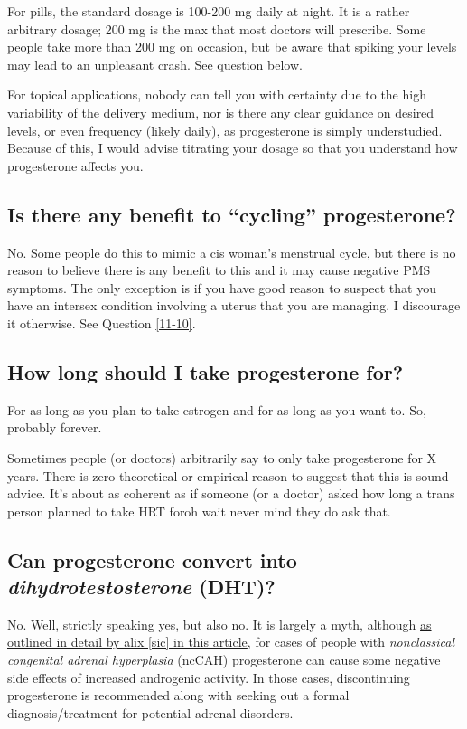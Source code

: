 \documentclass{article}
\begin{document}
For pills, the standard dosage is 100-200 mg daily at night. It is a rather arbitrary dosage; 200 mg is the max that most doctors will prescribe. Some people take more than 200 mg on occasion, but be aware that spiking your levels may lead to an unpleasant crash. See question below.

For topical applications, nobody can tell you with certainty due to the high variability of the delivery medium, nor is there any clear guidance on desired levels, or even frequency (likely daily), as progesterone is simply understudied. Because of this, I would advise titrating your dosage so that you understand how progesterone affects you.

\subsection{Is there any benefit to “cycling” progesterone?}\label{8-11}

No. Some people do this to mimic a cis woman’s menstrual cycle, but there is no reason to believe there is any benefit to this and it may cause negative PMS symptoms. The only exception is if you have good reason to suspect that you have an intersex condition involving a uterus that you are managing. I discourage it otherwise. See Question \ref{11-10}.

\subsection{How long should I take progesterone for?}

For as long as you plan to take estrogen and for as long as you want to. So, probably forever.

Sometimes people (or doctors) arbitrarily say to only take progesterone for X years. There is zero theoretical or empirical reason to suggest that this is sound advice. It's about as coherent as if someone (or a doctor) asked how long a trans person planned to take HRT for\textemdash{}oh wait never mind they do ask that.

\subsection{Can progesterone convert into \textit{dihydrotestosterone} (DHT)?}

No. Well, strictly speaking yes, but also no. It is largely a myth, although \href{https://whsah.co/posts/rethinking-progesterone-and-androgens/}{as outlined in detail by alix [sic] in this article}, for cases of people with \textit{nonclassical congenital adrenal hyperplasia} (ncCAH) progesterone can cause some negative side effects of increased androgenic activity. In those cases, discontinuing progesterone is recommended along with seeking out a formal diagnosis/treatment for potential adrenal disorders.
\end{document}
